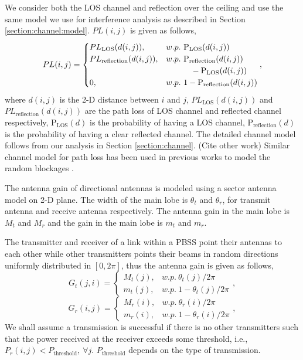 \documentclass[10pt, conference, letterpaper]{IEEEtran}
\DeclareMathOperator*{\LOS}{\mathrm{LOS}}
\begin{document}
We consider both the LOS channel and reflection over the ceiling and use the same model we use for interference analysis as described in Section \ref{section:channel:model}.
$PL(i,j)$ is given as follows, 
\begin{equation*}
PL(i,j) = 
\begin{cases}
PL_{\LOS}(d(i,j)), & w.p. ~ \mathrm{P_{LOS}}(d(i,j))\\
PL_{\mathrm{reflection}}(d(i,j)), & w.p. ~ \mathrm{P_{reflection}}(d(i,j)) \\ \hfill  & \phantom{w.p. + {}} - \mathrm{P_{LOS}}(d(i,j)) \\
0, & w.p. ~ 1-\mathrm{P_{reflection}}(d(i,j))
\end{cases},
\end{equation*}
where $d(i,j)$ is the 2-D distance between $i$ and $j$, $PL_{\LOS}(d(i,j))$ and $PL_{\mathrm{reflection}}(d(i,j))$ are the path loss of LOS channel and reflected channel respectively, $\mathrm{P_{LOS}}(d)$ is the probability of having a LOS channel, $\mathrm{P_{reflection}}(d)$ is the probability of having a clear reflected channel. 
The detailed channel model follows from our analysis in Section \ref{section:channel}. 
(Cite other work) Similar channel model for path loss has been used in previous works to model the random blockages \cite{urbanblockage}\cite{interferencefinitesized}\cite{enclosedmmwave}.

The antenna gain of directional antennas is modeled using a sector antenna model on 2-D plane.%
The width of the main lobe is $\theta_t$ and $\theta_r$, for transmit antenna and receive antenna respectively. 
The antenna gain in the main lobe is $M_t$ and $M_r$ and the gain in the main lobe is $m_t$ and $m_r$.

The transmitter and receiver of a link within a PBSS point their antennas to each other while other transmitters points their beams in random directions uniformly distributed in $[0, 2\pi]$, thus the antenna gain is given as follows,
\begin{equation*}
G_t(j,i) = 
\begin{cases}
M_t(j), & w.p. ~ \theta_t(j)/2\pi \\
m_t(j), & w.p. ~ 1-\theta_t(j)/2\pi
\end{cases},
\end{equation*}
\begin{equation*}
G_r(i,j) = 
\begin{cases}
M_r(i), & w.p. ~ \theta_r(i)/2\pi \\
m_r(i), & w.p. ~ 1-\theta_r(i)/2\pi
\end{cases},
\end{equation*}
We shall assume a transmission is successful if there is no other transmitters such that the power received at the receiver exceeds some threshold, i.e., $P_r(i,j)< P_{\mathrm{threshold}}, ~ \forall j$. 
$P_{\mathrm{threshold}}$ depends on the type of transmission. 
\end{document}
